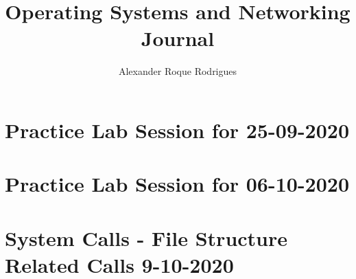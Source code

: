 \documentclass[12pt,a4paper]{article}
\author{Alexander Roque Rodrigues}
\title{Operating Systems and Networking Journal}
\begin{document}
\maketitle
\tableofcontents

\section{Practice Lab Session for 25-09-2020}


\newpage
\section{Practice Lab Session for 06-10-2020}


\newpage
\section{System Calls - File Structure Related Calls 9-10-2020}

\end{document}
